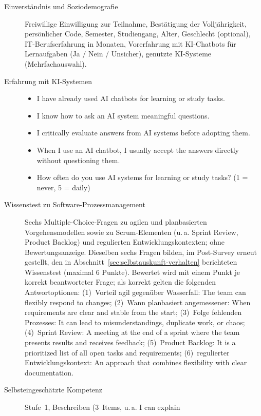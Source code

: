 \begin{description}
    \item[Einverständnis und Soziodemografie] Freiwillige Einwilligung zur Teilnahme, Bestätigung
    der Volljährigkeit, persönlicher Code, Semester, Studiengang, Alter, Geschlecht (optional),
    IT-Berufserfahrung in Monaten, Vorerfahrung mit KI-Chatbots für Lernaufgaben (Ja / Nein /
    Unsicher), genutzte KI-Systeme (Mehrfachauswahl).
    \item[Erfahrung mit KI-Systemen] \leavevmode
    \begin{itemize}
        \item I have already used AI chatbots for learning or study tasks.
        \item I know how to ask an AI system meaningful questions.
        \item I critically evaluate answers from AI systems before adopting them.
        \item When I use an AI chatbot, I usually accept the answers directly without questioning
        them.
        \item How often do you use AI systems for learning or study tasks? (1 = never, 5 = daily)
    \end{itemize}
    \item[Wissenstest zu Software-Prozessmanagement] Sechs Multiple-Choice-Fragen zu agilen und
    planbasierten Vorgehensmodellen sowie zu Scrum-Elementen (u.\,a. Sprint Review, Product
    Backlog) und regulierten Entwicklungskontexten; ohne Bewertungsanzeige. Dieselben sechs Fragen
    bilden, im Post-Survey erneut gestellt, den in Abschnitt~\ref{sec:selbstauskunft-verhalten}
    berichteten Wissenstest (maximal 6 Punkte). Bewertet wird mit einem Punkt je korrekt
    beantworteter Frage; als korrekt gelten die folgenden Antwortoptionen: (1)~Vorteil agil gegenüber
    Wasserfall: \glqq The team can flexibly respond to changes\grqq{}; (2)~Wann planbasiert
    angemessener: \glqq When requirements are clear and stable from the start\grqq{}; (3)~Folge
    fehlenden Prozesses: \glqq It can lead to misunderstandings, duplicate work, or chaos\grqq{};
    (4)~Sprint Review: \glqq A meeting at the end of a sprint where the team presents results and
    receives feedback\grqq{}; (5)~Product Backlog: \glqq It is a prioritized list of all open tasks
    and requirements\grqq{}; (6)~regulierter Entwicklungskontext: \glqq An approach that combines
    flexibility with clear documentation\grqq{}.
    \item[Selbsteingeschätzte Kompetenz] Stufe~1, Beschreiben (3~Items, u.\,a. \glqq I can explain

\end{description}
